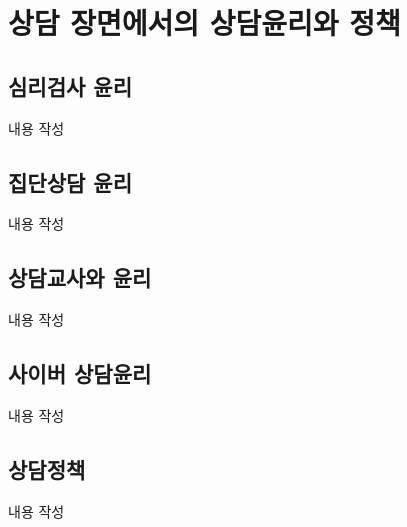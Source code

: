 \section{상담 장면에서의 상담윤리와 정책}

\subsection{심리검사 윤리}
내용 작성

\subsection{집단상담 윤리}
내용 작성

\subsection{상담교사와 윤리}
내용 작성

\subsection{사이버 상담윤리}
내용 작성

\subsection{상담정책}
내용 작성
